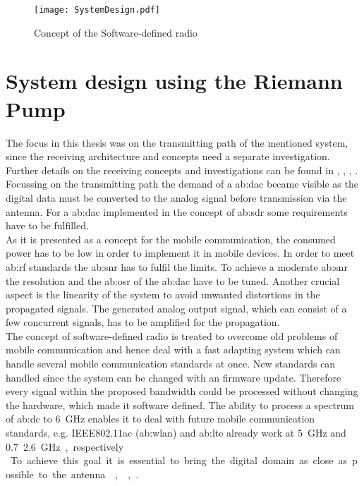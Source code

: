 \begin{figure}[ht]
	\centering
  \texttt{[image: SystemDesign.pdf]}
	\caption{Concept of the Software-defined radio}
	\label{fig:System}
\end{figure}

\section{System design using the Riemann Pump} %
The focus in this thesis was on the transmitting path of the mentioned system, since the receiving architecture and concepts need a separate investigation.
Further details on the receiving concepts and investigations can be found in \citep{RivetFadhuileDevalEtAl2013}, \cite{RivetDevalD.2008}, \cite{RivetF.2014}, \cite{RivetDevalBegueretJ.-B.2007}.
Focussing on the transmitting path the demand of a \gls{ab:dac} became visible as the digital data must be converted to the analog signal before transmission via the antenna.
For a \gls{ab:dac} implemented in the concept of \gls{ab:sdr} some requirements have to be fulfilled.\\
As it is presented as a concept for the mobile communication, the consumed power has to be low in order to implement it in mobile devices.
In order to meet \gls{ab:rf} standards the \gls{ab:snr} has to fulfil the limits.
To achieve a moderate \gls{ab:snr} the resolution and the \gls{ab:osr} of the \gls{ab:dac} have to be tuned.
Another crucial aspect is the linearity of the system to avoid unwanted distortions in the propagated signals.
The generated analog output signal, which can consist of a few concurrent signals, has to be amplified for the propagation.\\
The concept of software-defined radio is treated to overcome old problems of mobile communication and hence deal with a fast adapting system which can handle several mobile communication standards at once.
New standards can handled since the system can be changed with an firmware update. 
Therefore every signal within the proposed bandwidth could be processed without changing the hardware, which made it software defined.
The ability to process a spectrum of \gls{ab:dc} to \SI{6}{\giga \hertz} enables it to deal with future mobile communication standards, e.g. IEEE802.11ac (\gls{ab:wlan}) and \gls{ab:lte} already work at \SI{5}{\giga \hertz} and \SI{0.7} ... \SI{2.6}{\giga \hertz}, respectively.\\
To achieve this goal it is essential to bring the digital domain as close as possible to the antenna \cite{RivetDevalBegueretJ.-B.2007}, \cite{DevalRivetVeyracEtAl2013},\cite{RivetDevalJ.-B.EtAl2010}.
